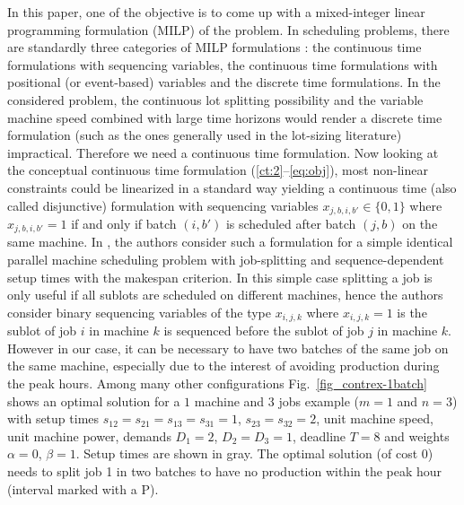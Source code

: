 In this paper, one of the objective is to come up with a mixed-integer
linear programming formulation (MILP) of the problem. In scheduling
problems, there are standardly three categories of MILP formulations
\cite{queyranne1994}: the continuous time formulations with sequencing
variables, the continuous time formulations with positional (or
event-based) variables and the discrete time formulations. In the
considered problem, the continuous lot splitting possibility and the
variable machine speed combined with large time horizons would render
a discrete time formulation (such as the ones generally used in the
lot-sizing literature) impractical. Therefore we need a continuous
time formulation. Now looking at the conceptual continuous time
formulation (\ref{ct:2}--\ref{eq:obj}), most non-linear constraints
could be linearized in a standard way yielding a continuous time (also
called disjunctive) formulation with sequencing variables
$x_{j,b,i,b'}\in\{0,1\}$ where $x_{j,b,i,b'}=1$ if and only if batch
$(i,b')$ is scheduled after batch $(j,b)$ on the same machine. In
\cite{neron2001}, the authors consider such a formulation for a simple
identical parallel machine scheduling problem with job-splitting and
sequence-dependent setup times with the makespan criterion. In this
simple case splitting a job is only useful if all sublots are
scheduled on different machines, hence the authors consider binary
sequencing variables of the type $x_{i,j,k}$ where $x_{i,j,k}=1$ is
the sublot of job $i$ in machine $k$ is sequenced before the sublot of
job $j$ in machine $k$.  However in our case, it can be necessary to
have two batches of the same job on the same machine, especially due
to the interest of avoiding production during the peak hours. Among
many other configurations Fig.~\ref{fig_contrex-1batch} shows an
optimal solution for a $1$ machine and $3$ jobs example ($m=1$ and
$n=3$) with setup times $s_{12}=s_{21}=s_{13}=s_{31}=1$,
$s_{23}=s_{32}=2$, unit machine speed, unit machine power, demands
$D_1=2$, $D_2=D_3=1$, deadline $T=8$ and weights $\alpha=0$,
$\beta=1$. Setup times are shown in gray.  The optimal solution (of
cost $0$) needs to split job 1 in two batches to have no production
within the peak hour (interval marked with a P).


